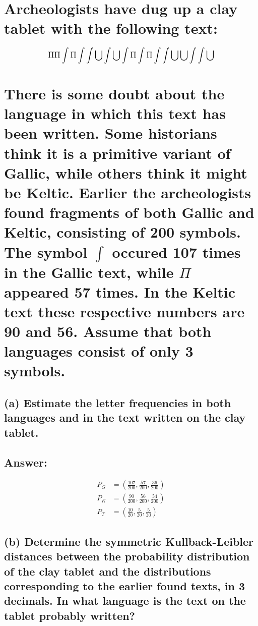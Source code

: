\documentclass[11px]{article}
\begin{document}
\section{\normalfont Archeologists have dug up a clay tablet with the following text:}
\begin{equation}
\mathlarger{\Pi\Pi\int\Pi\int\int\bigcup\int\bigcup\int\Pi\int\Pi\int\int\bigcup\bigcup\int\int\bigcup}
\end{equation}

\section*{\normalfont There is some doubt about the language in which this text has been written. Some historians think it is a primitive variant of Gallic, while others think it might be Keltic. Earlier the archeologists found fragments of both Gallic and Keltic, consisting of 200 symbols. The symbol \(\int\) occured 107 times in the Gallic text, while \(\Pi\) appeared 57 times. In the Keltic text these respective numbers are 90 and 56. Assume that both languages consist of only 3 symbols.}

\subsection*{\normalfont (a) Estimate the letter frequencies in both languages and in the text written on the clay tablet.}

\subsection*{Answer: }

\begin{equation}
\begin{split}
P_G & = (\frac{107}{200}, \frac{57}{200}, \frac{36}{200}) \\
P_K & = (\frac{90}{200}, \frac{56}{200}, \frac{54}{200}) \\
P_T & = (\frac{10}{20}, \frac{5}{20}, \frac{5}{20})
\end{split}
\end{equation}

\subsection*{\normalfont (b) Determine the symmetric Kullback-Leibler distances between the probability distribution of the clay tablet and the distributions corresponding to the earlier found texts, in 3 decimals. In what language is the text on the tablet probably written?}
\end{document}
